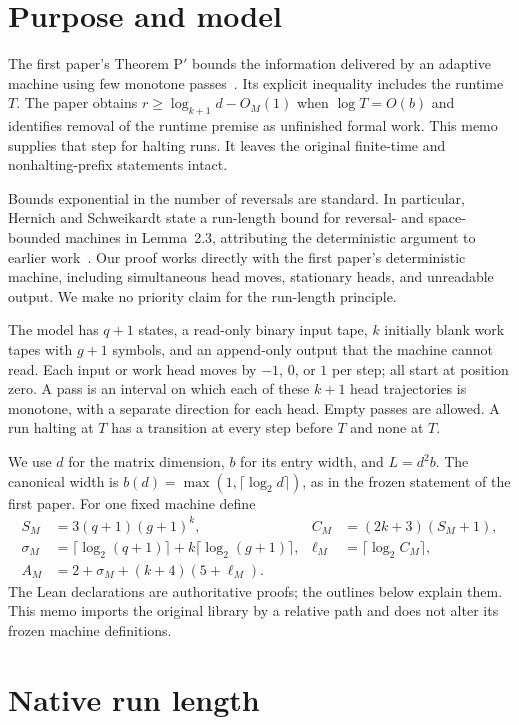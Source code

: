 \section{Purpose and model}\label{sec:introduction}
The first paper's Theorem P$'$ bounds the information delivered by an adaptive
machine using few monotone passes~\cite{BrendeTranspose}. Its explicit
inequality includes the runtime $T$. The paper obtains
$r\ge\log_{k+1}d-O_M(1)$ when $\log T=O(b)$ and identifies removal of the
runtime premise as unfinished formal work. This memo supplies that step for
halting runs. It leaves the original finite-time and nonhalting-prefix
statements intact.

Bounds exponential in the number of reversals are standard. In particular,
Hernich and Schweikardt state a run-length bound for reversal- and
space-bounded machines in Lemma~2.3, attributing the deterministic argument
to earlier work~\cite{HernichSchweikardt2006}. Our proof works directly with
the first paper's deterministic machine, including simultaneous head moves,
stationary heads, and unreadable output. We make no priority claim for the
run-length principle.

The model has $q+1$ states, a read-only binary input tape, $k$ initially blank
work tapes with $g+1$ symbols, and an append-only output that the machine
cannot read. Each input or work head moves by $-1$, $0$, or $1$ per step;
all start at position zero. A pass is an interval on which each of these
$k+1$ head trajectories is monotone, with a separate direction for each
head. Empty passes are allowed. A run halting at $T$ has a transition at
every step before $T$ and none at $T$.

We use $d$ for the matrix dimension, $b$ for its entry width, and $L=d^2b$.
The canonical width is $b(d)=\max(1,\lceil\log_2d\rceil)$, as in the frozen
statement of the first paper. For one fixed machine define
\begin{align}
 S_M&=3(q+1)(g+1)^k,& C_M&=(2k+3)(S_M+1),\label{eq:machine-constants}\\
 \sigma_M&=\lceil\log_2(q+1)\rceil+k\lceil\log_2(g+1)\rceil,&
 \ell_M&=\lceil\log_2 C_M\rceil,\nonumber\\
 A_M&=2+\sigma_M+(k+4)(5+\ell_M).\label{eq:pass-constant}
\end{align}
The Lean declarations are authoritative proofs; the outlines below explain
them. This memo imports the original library by a relative path and does
not alter its frozen machine definitions.

\section{Native run length}\label{sec:run-length}

